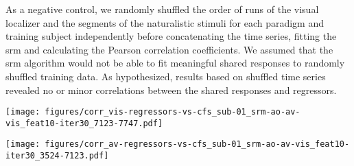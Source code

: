 As a negative control, we randomly shuffled the order of runs of the visual
localizer and the segments of the naturalistic stimuli for each paradigm and
training subject independently before concatenating the time series, fitting the
\ac{srm} and calculating the Pearson correlation coefficients.
%
We assumed that the \ac{srm} algorithm would not be able to fit meaningful
shared responses to randomly shuffled training data.
%
As hypothesized, results based on shuffled time series revealed no or minor
correlations between the shared responses and regressors.




\begin{figure*}[tbp]
\centering
\texttt{[image: figures/corr\_vis-regressors-vs-cfs\_sub-01\_srm-ao-av-vis\_feat10-iter30\_7123-7747.pdf]}
    \caption{
    \textbf{Correlations between regressors of the visual localizer and
    shared features during corresponding \acp{tr}.}
    Pearson correlation coefficients between regressors
    created in \citet{sengupta2016extension} to model hemodynamic responses
    during the six-category visual localizer paradigm
    and the shared features within the \ac{cfs}
    (as calculated for subject 01 from $N-1$ training subjects in the first
    fold of the cross-validation).
    }
    \label{fig:corr-vis-reg-srm}
\end{figure*}


\begin{figure*}[tbp]
\centering
    \texttt{[image: figures/corr\_av-regressors-vs-cfs\_sub-01\_srm-ao-av-vis\_feat10-iter30\_3524-7123.pdf]}
    \caption{
    \textbf{Correlations between regressors of the movie and shared features
    during corresponding \acp{tr}.}
    Pearson correlation coefficients between regressors
    created in \citet{haeusler2022processing} to model hemodynamic responses to
    the movie
    \citep[cf. Table 3 in][]{haeusler2022processing}
    and the shared features within the \ac{cfs}
    (as calculated for subject 01 from $N-1$ training subjects in the first
    fold of the cross-validation).
    }
    \label{fig:corr-av-reg-srm}
\end{figure*}



